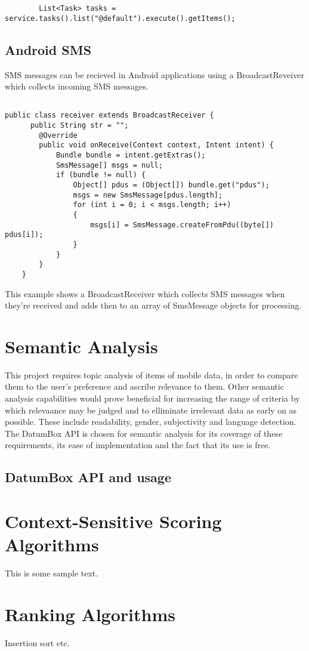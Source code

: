 \lstset{language=Java, caption=Google Tasks example, label=GoogleTasksExample}
\begin{lstlisting}
    	List<Task> tasks = service.tasks().list("@default").execute().getItems();
\end{lstlisting}

\subsection{Android SMS}
SMS messages can be recieved in Android applications using a BroadcastReveiver which collects incoming SMS messages.

\lstset{language=Java, caption=Android SMS example, label=AndroidSMSExample}
\begin{lstlisting}

public class receiver extends BroadcastReceiver {
      public String str = "";
        @Override
        public void onReceive(Context context, Intent intent) {
            Bundle bundle = intent.getExtras();
            SmsMessage[] msgs = null;
            if (bundle != null) {
                Object[] pdus = (Object[]) bundle.get("pdus");
                msgs = new SmsMessage[pdus.length];
                for (int i = 0; i < msgs.length; i++) 
                {
                    msgs[i] = SmsMessage.createFromPdu((byte[]) pdus[i]);
                }
            }
        }
    }

\end{lstlisting}

This example shows a BroadcastReceiver which collects SMS messages when they're received and adds then to an array of SmsMessage objects for processing. 

\section{Semantic Analysis}

This project requires topic analysis of items of mobile data, in order to compare them to the user's preference and ascribe relevance to them. Other semantic analysis capabilities would prove beneficial for increasing the range of criteria by which relevaance may be judged and to elliminate irrelevant data as early on as possible. These include readability, gender, subjectivity and language detection. The DatumBox API is chosen for semantic analysis for its coverage of these requirements, its ease of implementation and the fact that its use is free. 

\subsection{DatumBox API and usage}

\section{Context-Sensitive Scoring Algorithms}

This is some sample text.

\section{Ranking Algorithms}

Insertion sort etc.
